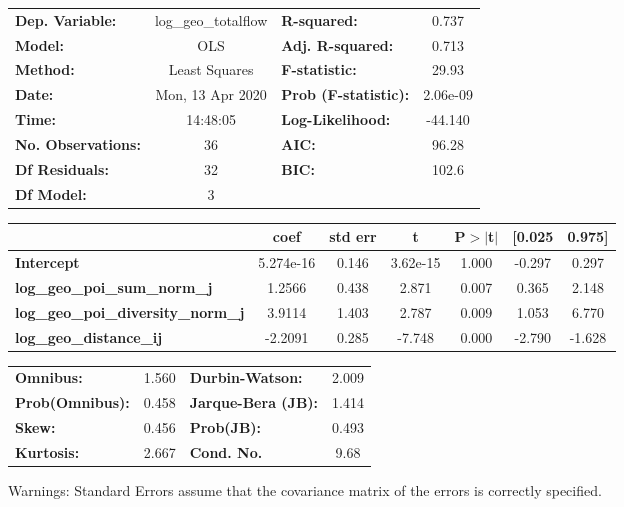 \begin{center}
\begin{tabular}{lclc}
\toprule
\textbf{Dep. Variable:}                    & log\_geo\_totalflow & \textbf{  R-squared:         } &     0.737   \\
\textbf{Model:}                            &         OLS         & \textbf{  Adj. R-squared:    } &     0.713   \\
\textbf{Method:}                           &    Least Squares    & \textbf{  F-statistic:       } &     29.93   \\
\textbf{Date:}                             &   Mon, 13 Apr 2020  & \textbf{  Prob (F-statistic):} &  2.06e-09   \\
\textbf{Time:}                             &       14:48:05      & \textbf{  Log-Likelihood:    } &   -44.140   \\
\textbf{No. Observations:}                 &            36       & \textbf{  AIC:               } &     96.28   \\
\textbf{Df Residuals:}                     &            32       & \textbf{  BIC:               } &     102.6   \\
\textbf{Df Model:}                         &             3       & \textbf{                     } &             \\
\bottomrule
\end{tabular}
\begin{tabular}{lcccccc}
                                           & \textbf{coef} & \textbf{std err} & \textbf{t} & \textbf{P$> |$t$|$} & \textbf{[0.025} & \textbf{0.975]}  \\
\midrule
\textbf{Intercept}                         &    5.274e-16  &        0.146     &  3.62e-15  &         1.000        &       -0.297    &        0.297     \\
\textbf{log\_geo\_poi\_sum\_norm\_j}       &       1.2566  &        0.438     &     2.871  &         0.007        &        0.365    &        2.148     \\
\textbf{log\_geo\_poi\_diversity\_norm\_j} &       3.9114  &        1.403     &     2.787  &         0.009        &        1.053    &        6.770     \\
\textbf{log\_geo\_distance\_ij}            &      -2.2091  &        0.285     &    -7.748  &         0.000        &       -2.790    &       -1.628     \\
\bottomrule
\end{tabular}
\begin{tabular}{lclc}
\textbf{Omnibus:}       &  1.560 & \textbf{  Durbin-Watson:     } &    2.009  \\
\textbf{Prob(Omnibus):} &  0.458 & \textbf{  Jarque-Bera (JB):  } &    1.414  \\
\textbf{Skew:}          &  0.456 & \textbf{  Prob(JB):          } &    0.493  \\
\textbf{Kurtosis:}      &  2.667 & \textbf{  Cond. No.          } &     9.68  \\
\bottomrule
\end{tabular}
\end{center}

Warnings: \newline
 [1] Standard Errors assume that the covariance matrix of the errors is correctly specified.
